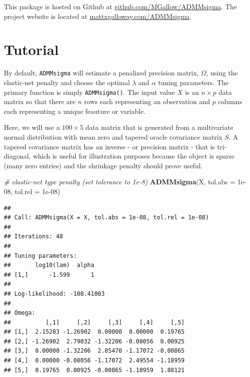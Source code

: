 \documentclass[11pt,]{report}
\newenvironment{Shaded}{\begin{snugshade}}{\end{snugshade}}
\newcommand{\CommentTok}[1]{\textcolor[rgb]{0.56,0.35,0.01}{\textit{#1}}}
\newcommand{\DataTypeTok}[1]{\textcolor[rgb]{0.13,0.29,0.53}{#1}}
\newcommand{\FloatTok}[1]{\textcolor[rgb]{0.00,0.00,0.81}{#1}}
\newcommand{\KeywordTok}[1]{\textcolor[rgb]{0.13,0.29,0.53}{\textbf{#1}}}
\newcommand{\NormalTok}[1]{#1}
\begin{document}
This package is hosted on Github at \href{https://github.com/MGallow/ADMMsigma}{github.com/MGallow/ADMMsigma}. The project website is located at \href{http://mattxgalloway.com/ADMMsigma/}{mattxgalloway.com/ADMMsigma}.

\hypertarget{tutorial}{%
\section{Tutorial}\label{tutorial}}

By default, \texttt{ADMMsigma} will estimate a penalized precision matrix, \(\Omega\), using the elastic-net penalty and choose the optimal \(\lambda\) and \(\alpha\) tuning parameters. The primary function is simply \texttt{ADMMsigma()}. The input value \(X\) is an \(n \times p\) data matrix so that there are \(n\) rows each representing an observation and \(p\) columns each representing a unique feauture or variable.

Here, we will use a \(100 \times 5\) data matrix that is generated from a multivariate normal distribution with mean zero and tapered oracle covariance matrix \(S\). A tapered covariance matrix has an inverse - or precision matrix - that is tri-diagonal, which is useful for illustration purposes because the object is sparse (many zero entries) and the shrinkage penalty should prove useful.

\vspace{0.5cm}

\begin{Shaded}
\begin{Highlighting}[]
\CommentTok{# elastic-net type penalty (set tolerance to 1e-8)}
\KeywordTok{ADMMsigma}\NormalTok{(X, }\DataTypeTok{tol.abs =} \FloatTok{1e-08}\NormalTok{, }\DataTypeTok{tol.rel =} \FloatTok{1e-08}\NormalTok{)}
\end{Highlighting}
\end{Shaded}

\begin{verbatim}
## 
## Call: ADMMsigma(X = X, tol.abs = 1e-08, tol.rel = 1e-08)
## 
## Iterations: 48
## 
## Tuning parameters:
##       log10(lam)  alpha
## [1,]      -1.599      1
## 
## Log-likelihood: -108.41003
## 
## Omega:
##          [,1]     [,2]     [,3]     [,4]     [,5]
## [1,]  2.15283 -1.26902  0.00000  0.00000  0.19765
## [2,] -1.26902  2.79032 -1.32206 -0.08056  0.00925
## [3,]  0.00000 -1.32206  2.85470 -1.17072 -0.00865
## [4,]  0.00000 -0.08056 -1.17072  2.49554 -1.18959
## [5,]  0.19765  0.00925 -0.00865 -1.18959  1.88121
\end{verbatim}
\end{document}
